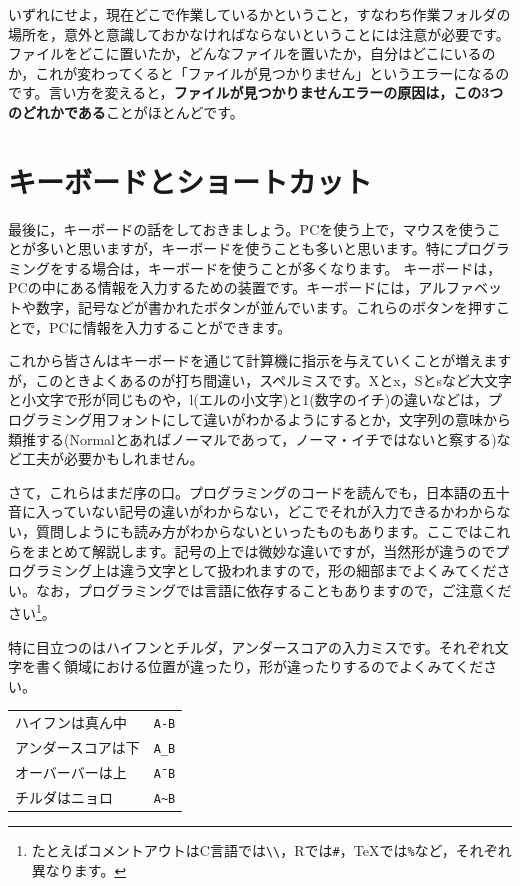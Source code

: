 \documentclass{ltjsbook}
\begin{document}
いずれにせよ，現在どこで作業しているかということ，すなわち作業フォルダの場所を，意外と意識しておかなければならないということには注意が必要です。ファイルをどこに置いたか，どんなファイルを置いたか，自分はどこにいるのか，これが変わってくると「ファイルが見つかりません」というエラーになるのです。言い方を変えると，\textbf{ファイルが見つかりませんエラーの原因は，この3つのどれかである}ことがほとんどです。

\section{キーボードとショートカット}
最後に，キーボードの話をしておきましょう。PCを使う上で，マウスを使うことが多いと思いますが，キーボードを使うことも多いと思います。特にプログラミングをする場合は，キーボードを使うことが多くなります。
キーボードは，PCの中にある情報を入力するための装置です。キーボードには，アルファベットや数字，記号などが書かれたボタンが並んでいます。これらのボタンを押すことで，PCに情報を入力することができます。

これから皆さんはキーボードを通じて計算機に指示を与えていくことが増えますが，このときよくあるのが打ち間違い，スペルミスです。Xとx，Sとsなど大文字と小文字で形が同じものや，l(エルの小文字)と1(数字のイチ)の違いなどは，プログラミング用フォントにして違いがわかるようにするとか，文字列の意味から類推する(Normalとあればノーマルであって，ノーマ・イチではないと察する)など工夫が必要かもしれません。

さて，これらはまだ序の口。プログラミングのコードを読んでも，日本語の五十音に入っていない記号の違いがわからない，どこでそれが入力できるかわからない，質問しようにも読み方がわからないといったものもあります。ここではこれらをまとめて解説します。記号の上では微妙な違いですが，当然形が違うのでプログラミング上は違う文字として扱われますので，形の細部までよくみてください。なお，プログラミングでは言語に依存することもありますので，ご注意ください\footnote{たとえばコメントアウトはC言語では\verb|\\|，Rでは\verb|#|，TeXでは\verb|%|など，それぞれ異なります。}。

特に目立つのはハイフンとチルダ，アンダースコアの入力ミスです。それぞれ文字を書く領域における位置が違ったり，形が違ったりするのでよくみてください。
\begin{center}

	\Large{
		\begin{tabular}{ll}
			ハイフンは真ん中  & \verb|A-B| \\
			アンダースコアは下 & \verb|A_B| \\
			オーバーバーは上  & \verb|A¯B| \\
			チルダはニョロ   & \verb|A~B| \\
		\end{tabular}
	}

\end{center}
\end{document}
